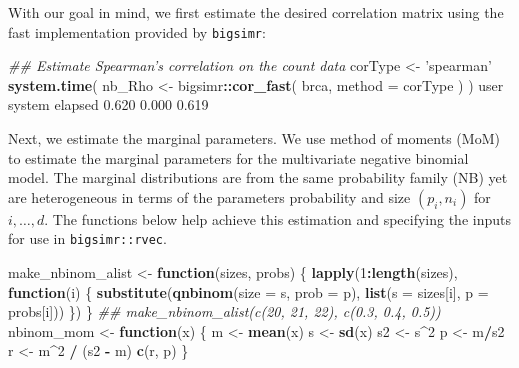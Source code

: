 \documentclass[]{article}
\newenvironment{Shaded}{\begin{snugshade}}{\end{snugshade}}
\newcommand{\CommentTok}[1]{\textcolor[rgb]{0.56,0.35,0.01}{\textit{#1}}}
\newcommand{\ControlFlowTok}[1]{\textcolor[rgb]{0.13,0.29,0.53}{\textbf{#1}}}
\newcommand{\DataTypeTok}[1]{\textcolor[rgb]{0.13,0.29,0.53}{#1}}
\newcommand{\DecValTok}[1]{\textcolor[rgb]{0.00,0.00,0.81}{#1}}
\newcommand{\FloatTok}[1]{\textcolor[rgb]{0.00,0.00,0.81}{#1}}
\newcommand{\KeywordTok}[1]{\textcolor[rgb]{0.13,0.29,0.53}{\textbf{#1}}}
\newcommand{\NormalTok}[1]{#1}
\newcommand{\OperatorTok}[1]{\textcolor[rgb]{0.81,0.36,0.00}{\textbf{#1}}}
\newcommand{\StringTok}[1]{\textcolor[rgb]{0.31,0.60,0.02}{#1}}
\begin{document}
With our goal in mind, we first estimate the desired correlation matrix using the fast implementation provided by \texttt{bigsimr}:

\begin{Shaded}
\begin{Highlighting}[]
\CommentTok{## Estimate Spearman's correlation on the count data}
\NormalTok{corType <-}\StringTok{ 'spearman'}
\KeywordTok{system.time}\NormalTok{( nb_Rho <-}\StringTok{ }\NormalTok{bigsimr}\OperatorTok{::}\KeywordTok{cor_fast}\NormalTok{( brca, }\DataTypeTok{method =}\NormalTok{ corType ) )}
\NormalTok{   user  system elapsed }
  \FloatTok{0.620}   \FloatTok{0.000}   \FloatTok{0.619} 
\end{Highlighting}
\end{Shaded}

Next, we estimate the marginal parameters.
We use method of moments (MoM) to estimate the marginal parameters for the multivariate negative binomial model.
The marginal distributions are from the same probability family (NB) yet are heterogeneous in terms of the parameters probability and size \((p_i, n_i)\) for \(i,\ldots,d\).
The functions below help achieve this estimation and specifying the inputs for use in \texttt{bigsimr::rvec}.

\begin{Shaded}
\begin{Highlighting}[]
\NormalTok{make_nbinom_alist <-}\StringTok{ }\ControlFlowTok{function}\NormalTok{(sizes, probs) \{}
  \KeywordTok{lapply}\NormalTok{(}\DecValTok{1}\OperatorTok{:}\KeywordTok{length}\NormalTok{(sizes), }\ControlFlowTok{function}\NormalTok{(i) \{}
    \KeywordTok{substitute}\NormalTok{(}\KeywordTok{qnbinom}\NormalTok{(}\DataTypeTok{size =}\NormalTok{ s, }\DataTypeTok{prob =}\NormalTok{ p), }
               \KeywordTok{list}\NormalTok{(}\DataTypeTok{s =}\NormalTok{ sizes[i], }\DataTypeTok{p =}\NormalTok{ probs[i]))}
\NormalTok{  \})}
\NormalTok{\}}
\CommentTok{## make_nbinom_alist(c(20, 21, 22), c(0.3, 0.4, 0.5))}
\NormalTok{nbinom_mom <-}\StringTok{ }\ControlFlowTok{function}\NormalTok{(x) \{}
\NormalTok{  m <-}\StringTok{ }\KeywordTok{mean}\NormalTok{(x)}
\NormalTok{  s <-}\StringTok{ }\KeywordTok{sd}\NormalTok{(x)}
\NormalTok{  s2 <-}\StringTok{ }\NormalTok{s}\OperatorTok{^}\DecValTok{2}
\NormalTok{  p <-}\StringTok{ }\NormalTok{m}\OperatorTok{/}\NormalTok{s2}
\NormalTok{  r <-}\StringTok{ }\NormalTok{m}\OperatorTok{^}\DecValTok{2} \OperatorTok{/}\StringTok{ }\NormalTok{(s2 }\OperatorTok{-}\StringTok{ }\NormalTok{m)}
  \KeywordTok{c}\NormalTok{(r, p)}
\NormalTok{\}}
\end{Highlighting}
\end{Shaded}
\end{document}
